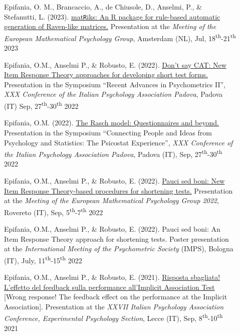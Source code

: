 \documentclass[letterpaper,12pt]{article}
\begin{document}
\begin{description}
	\item[] Epifania, O. M., Brancaccio, A., de Chiusole, D., Anselmi, P., \& Stefanutti, L. (2023). \href{https://ottaviae.github.io/presentations/empg2023/empg2023-Epifania.pdf}{mat\texttt{R}iks: An R package for rule-based automatic generation of Raven-like matrices.} Presentation at the \emph{Meeting of the European Mathematical Psychology Group},  Amsterdam (NL), Jul, 18\textsuperscript{th}-21\textsuperscript{th} 2023
	
	\item[] Epifania, O.M., Anselmi P., \& Robusto, E. (2022). \href{https://ottaviae.github.io/presentations/2022/aipIRT.pdf}{Don't say CAT: New Item Response Theory approaches for developing short test forms.} Presentation in the Symposium “Recent Advances in Psychometrics II”, \emph{XXX Conference of the Italian Psychology Association Padova}, Padova (IT) Sep, 27\textsuperscript{th}-30\textsuperscript{th} 2022
	
	\item[] Epifania, O.M. (2022). \href{https://ottaviae.github.io/presentations/2022/epifaniaRasch.pdf}{The Rasch model: Questionnaires and beyond.} Presentation in the Symposium “Connecting People and Ideas from Psychology and Statistics: The Psicostat Experience”, \emph{XXX Conference of the Italian Psychology Association Padova}, Padova (IT), Sep, 27\textsuperscript{th}-30\textsuperscript{th} 2022
	
		\item[] Epifania, O.M., Anselmi P., \& Robusto, E. (2022). \href{https://ottaviae.github.io/presentations/2022/presentationEpifania-empg.pdf}{Pauci sed boni: New Item Response Theory-based procedures for shortening tests.} Presentation at the \emph{Meeting of the European Mathematical Psychology Group 2022},  Rovereto (IT), Sep, 5\textsuperscript{th}-7\textsuperscript{th} 2022
	
	\item[] Epifania, O.M., Anselmi P., \& Robusto, E. (2022). Pauci sed boni: An Item Response Theory approach for shortening tests. Poster presentation at the \emph{International Meeting of the Psychometric Society} (IMPS), Bologna (IT), July, 11\textsuperscript{th}-15\textsuperscript{th} 2022
	
	\item[] Epifania, O.M., Anselmi P., \& Robusto, E. (2021). \href{https://ottaviae.github.io/presentations/2021/Risposta-sbagliata!.pdf}{Risposta sbagliata! L’effetto del feedback sulla performance all’Implicit Association Test} [Wrong response! The feedback effect on the performance at the Implicit Association]. Presentation at the \emph{XXVII Italian Psychology Association Conference, Experimental Psychology Section}, Lecce (IT), Sep, 8\textsuperscript{th}-10\textsuperscript{th} 2021
	

\end{description}
\end{document}
